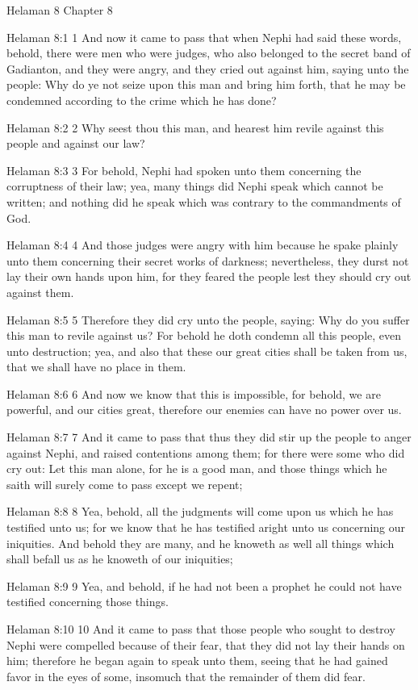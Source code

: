 Helaman 8
Chapter 8

Helaman 8:1
 1 And now it came to pass that when Nephi had said these words,
behold, there were men who were judges, who also belonged to the
secret band of Gadianton, and they were angry, and they cried out
against him, saying unto the people: Why do ye not seize upon
this man and bring him forth, that he may be condemned according
to the crime which he has done?

Helaman 8:2
 2 Why seest thou this man, and hearest him revile against this
people and against our law?

Helaman 8:3
 3 For behold, Nephi had spoken unto them concerning the
corruptness of their law; yea, many things did Nephi speak which
cannot be written; and nothing did he speak which was contrary to
the commandments of God.

Helaman 8:4
 4 And those judges were angry with him because he spake plainly
unto them concerning their secret works of darkness;
nevertheless, they durst not lay their own hands upon him, for
they feared the people lest they should cry out against them.

Helaman 8:5
 5 Therefore they did cry unto the people, saying: Why do you
suffer this man to revile against us? For behold he doth condemn
all this people, even unto destruction; yea, and also that these
our great cities shall be taken from us, that we shall have no
place in them.

Helaman 8:6
 6 And now we know that this is impossible, for behold, we are
powerful, and our cities great, therefore our enemies can have no
power over us.

Helaman 8:7
 7 And it came to pass that thus they did stir up the people to
anger against Nephi, and raised contentions among them; for there
were some who did cry out: Let this man alone, for he is a good
man, and those things which he saith will surely come to pass
except we repent;

Helaman 8:8
 8 Yea, behold, all the judgments will come upon us which he has
testified unto us; for we know that he has testified aright unto
us concerning our iniquities. And behold they are many, and he
knoweth as well all things which shall befall us as he knoweth of
our iniquities;

Helaman 8:9
 9 Yea, and behold, if he had not been a prophet he could not
have testified concerning those things.

Helaman 8:10
 10 And it came to pass that those people who sought to destroy
Nephi were compelled because of their fear, that they did not lay
their hands on him; therefore he began again to speak unto them,
seeing that he had gained favor in the eyes of some, insomuch
that the remainder of them did fear.

